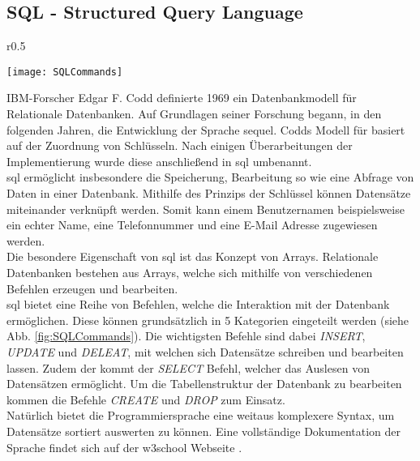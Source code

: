\subsection{SQL - Structured Query Language}
\begin{wrapfigure}{r}{0.5\textwidth}
    \vspace{-1.2cm}
    \begin{center}
      \texttt{[image: SQLCommands]}
    \end{center}
    \vspace{-0.5cm}
    \caption{SQL Befehls Kategorien \cite{SQLCommands}}
    \label{fig:SQLCommands}
    \vspace{-0.5cm}
  \end{wrapfigure}
IBM-Forscher Edgar F. Codd definierte 1969 ein Datenbankmodell für Relationale Datenbanken. Auf Grundlagen seiner Forschung begann, in den folgenden Jahren, die Entwicklung der Sprache \ac{sequel}. Codds Modell für basiert auf der Zuordnung von Schlüsseln. Nach einigen Überarbeitungen der Implementierung wurde diese anschließend in \ac{sql} umbenannt.\\
\ac{sql} ermöglicht insbesondere die Speicherung, Bearbeitung so wie eine Abfrage von Daten in einer Datenbank. Mithilfe des Prinzips der Schlüssel können Datensätze miteinander verknüpft werden. Somit kann einem Benutzernamen beispielsweise ein echter Name, eine Telefonnummer und eine E-Mail Adresse zugewiesen werden.\\
Die besondere Eigenschaft von \ac{sql} ist das Konzept von Arrays. Relationale Datenbanken bestehen aus Arrays, welche sich mithilfe von verschiedenen Befehlen erzeugen und bearbeiten. \cite{SQL}\\
\ac{sql} bietet eine Reihe von Befehlen, welche die Interaktion mit der Datenbank ermöglichen. Diese können grundsätzlich in 5 Kategorien eingeteilt werden (siehe Abb. \ref{fig:SQLCommands}). Die wichtigsten Befehle sind dabei \textit{INSERT}, \textit{UPDATE} und \textit{DELEAT}, mit welchen sich Datensätze schreiben und bearbeiten lassen. Zudem der kommt der \textit{SELECT} Befehl, welcher das Auslesen von Datensätzen ermöglicht. Um die Tabellenstruktur der Datenbank zu bearbeiten kommen die Befehle \textit{CREATE} und \textit{DROP} zum Einsatz. \cite{SQLCommands}\\
Natürlich bietet die Programmiersprache eine weitaus komplexere Syntax, um Datensätze sortiert auswerten zu können. Eine vollständige Dokumentation der Sprache findet sich auf der w3school Webseite \cite{SQLDoku}.
